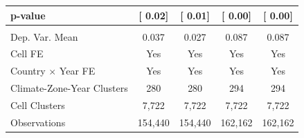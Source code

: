 {\begin{tabular}{l*{4}{c}}
\hspace{15pt} p-value&[     0.02]         &[     0.01]         &[     0.00]         &[     0.00]         \\
\hline \\ Dep. Var. Mean& 0.037         & 0.027         & 0.087         & 0.087         \\
Cell FE             &   Yes         &   Yes         &   Yes         &   Yes         \\
Country $\times$ Year FE&   Yes         &   Yes         &   Yes         &   Yes         \\
Climate-Zone-Year Clusters&   280         &   280         &   294         &   294         \\
Cell Clusters       & 7,722         & 7,722         & 7,722         & 7,722         \\
Observations        &154,440         &154,440         &162,162         &162,162         \\
\bottomrule
\end{tabular}
}
